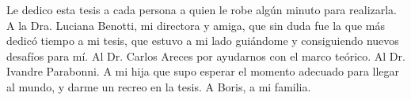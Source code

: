 
\vspace*{\fill}


Le dedico esta tesis a cada persona a quien le robe alg\'un minuto para realizarla. A la Dra. Luciana Benotti, mi directora y amiga, que sin duda fue la que m\'as dedic\'o tiempo a mi tesis, que estuvo a mi lado gui\'andome y consiguiendo nuevos desaf\'ios para m\'i. Al Dr. Carlos Areces por ayudarnos con el marco te\'orico. Al Dr. Ivandre Parabonni. A mi hija que supo esperar el momento adecuado para llegar al mundo, y darme un recreo en la tesis. A Boris, a mi familia. 


\vspace{\fill}
